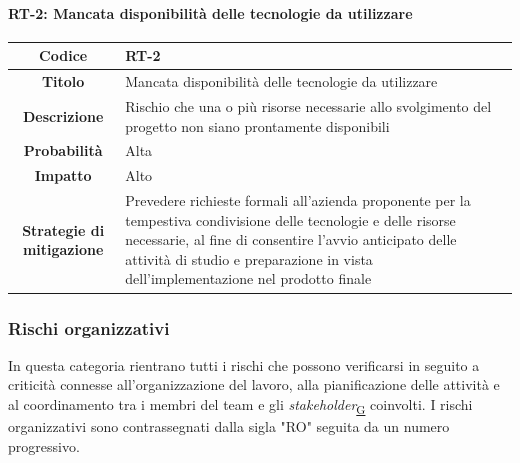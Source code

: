 \documentclass[a4paper,12pt]{article}
\begin{document}
{{            \paragraph{RT-2: Mancata disponibilità delle tecnologie da utilizzare}\mbox{}{ 
                \begin{longtable}{|c|p{11cm}|}
                    \hline
                    \textbf{Codice} & RT-2 \\
                    \hline
                    \textbf{Titolo} & Mancata disponibilità delle tecnologie da utilizzare \\
                    \hline
                    \textbf{Descrizione} & Rischio che una o più risorse necessarie allo svolgimento del progetto non siano prontamente disponibili \\
                    \hline
                    \textbf{Probabilità} & Alta \\
                    \hline
                    \textbf{Impatto} & Alto \\
                    \hline
                    \textbf{Strategie di mitigazione} & Prevedere richieste formali all'azienda proponente per la tempestiva condivisione delle tecnologie e delle risorse necessarie, al fine di consentire l'avvio anticipato delle attività di studio e preparazione in vista dell'implementazione nel prodotto finale \\
                    \hline
                \end{longtable}
            }
    
        \subsubsection{Rischi organizzativi}
            In questa categoria rientrano tutti i rischi che possono verificarsi in seguito a criticità connesse all'organizzazione del lavoro, alla pianificazione delle attività e al coordinamento tra i membri del team e gli \textit{stakeholder}\textsubscript{\href{https://atlasteam9.github.io/Atlas/glossario.html\#Stakeholder}{G}} coinvolti. I rischi organizzativi sono contrassegnati dalla sigla "RO" seguita da un numero progressivo.
            
}}
\end{document}
